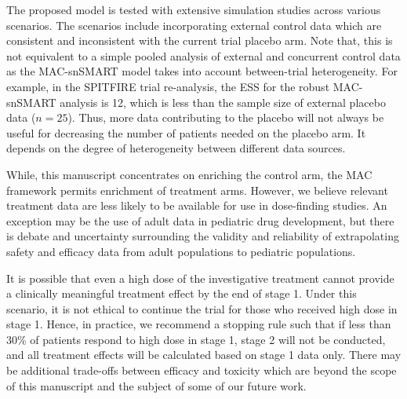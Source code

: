 The proposed model is tested with extensive simulation studies across various scenarios. The scenarios include incorporating external control data which are consistent and inconsistent with the current trial placebo arm. Note that, this is not equivalent to a simple pooled analysis of external and concurrent control data as the MAC-snSMART model takes into account between-trial heterogeneity. For example, in the SPITFIRE trial re-analysis, the \ac{ESS} for the robust MAC-snSMART analysis is 12, which is less than the sample size of external placebo data ($n=25$). Thus, more data contributing to the placebo will not always be useful for decreasing the number of patients needed on the placebo arm. It depends on the degree of heterogeneity between different data sources.

While, this manuscript concentrates on enriching the control arm, the MAC framework permits enrichment of treatment arms. However, we believe relevant treatment data are less likely to be available for use in dose-finding studies. An exception may be the use of adult data in pediatric drug development, but there is debate and uncertainty surrounding the validity and reliability of extrapolating safety and efficacy data from adult populations to pediatric populations.

It is possible that even a high dose of the investigative treatment cannot provide a clinically meaningful treatment effect by the end of stage 1. Under this scenario, it is not ethical to continue the trial for those who received high dose in stage 1. Hence, in practice, we recommend a stopping rule such that if less than 30\% of patients respond to high dose in stage 1, stage 2 will not be conducted, and all treatment effects will be calculated based on stage 1 data only. There may be additional trade-offs between efficacy and toxicity which are beyond the scope of this manuscript and the subject of some of our future work.

